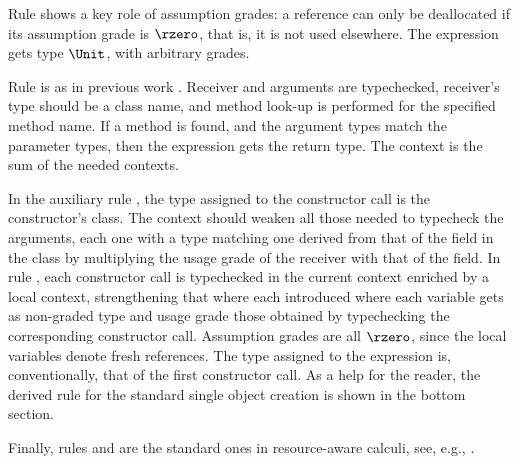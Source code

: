 Rule  shows a key role of assumption grades: a reference can only be deallocated if its assumption grade is $\rzero$, that is, it is not used elsewhere. The expression gets type $\Unit$, with arbitrary grades. 

Rule  is as in previous work \cite{BianchiniDGZ23ecoop}. Receiver and arguments are typechecked, receiver's type should be a class name, and method look-up is performed for the specified method name. If a method is found, and the argument types match the parameter types, then the expression gets the return type. The context is the sum of the needed contexts.


In the auxiliary rule , the type assigned to the  constructor call is the constructor's class. The context should weaken all those needed to typecheck the arguments, each one with a type matching one derived from that of the field in the class by multiplying the usage grade of the receiver with that of the field. 
In rule , each constructor call is typechecked in the current context enriched by a local context, strengthening that  where each introduced where each variable gets as non-graded type and usage grade those obtained by typechecking the corresponding constructor call. Assumption grades are all $\rzero$, since the local variables denote fresh references. The type assigned to the expression is, conventionally, that of the first constructor call.
As a help for the reader, the derived rule  for the standard single object creation is shown in the bottom section.


Finally, rules  and  are the standard ones in resource-aware calculi, see, e.g., \cite{BianchiniDGZ23oopsla}.

